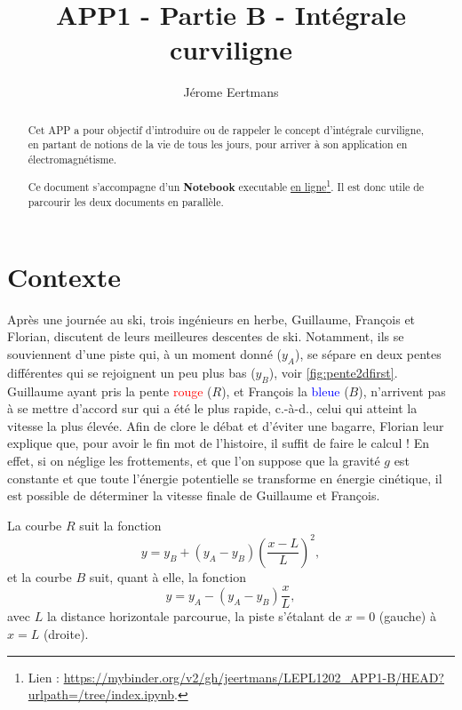 \documentclass{cup-pan}
\author{Jérome Eertmans}
\title{APP1 - Partie B - Intégrale curviligne}
\date{}
\begin{document}
\maketitle

\begin{abstract}

Cet APP a pour objectif d'introduire ou de rappeler le concept d'intégrale curviligne, en partant de notions de la vie de tous les jours, pour arriver à son application en électromagnétisme.

Ce document s'accompagne d'un \textbf{Notebook} executable \href{https://mybinder.org/v2/gh/jeertmans/LEPL1202_APP1-B/HEAD?urlpath=/tree/index.ipynb}{en ligne}\footnote{Lien : \url{https://mybinder.org/v2/gh/jeertmans/LEPL1202_APP1-B/HEAD?urlpath=/tree/index.ipynb}.}. Il est donc utile de parcourir les deux documents en parallèle.


\end{abstract}

\section{Contexte}

Après une journée au ski, trois ingénieurs en herbe, Guillaume, François et Florian, discutent de leurs meilleures descentes de ski. Notamment, ils se souviennent d'une piste qui, à un moment donné ($y_A$), se sépare en deux pentes différentes qui se rejoignent un peu plus bas ($y_B$), voir \autoref{fig:pente2dfirst}. Guillaume ayant pris la pente \textcolor{red}{rouge} ($R$), et François la \textcolor{blue}{bleue} ($B$), n'arrivent pas à se mettre d'accord sur qui a été le plus rapide, c.-à-d., celui qui atteint la vitesse la plus élevée. Afin de clore le débat et d'éviter une bagarre, Florian leur explique que, pour avoir le fin mot de l'histoire, il suffit de faire le calcul ! En effet, si on néglige les frottements, et que l'on suppose que la gravité $g$ est constante et que toute l'énergie potentielle se transforme en énergie cinétique, il est possible de déterminer la vitesse finale de Guillaume et François.

La courbe $R$ suit la fonction
\begin{equation}
    y = y_B + (y_A - y_B)\left(\frac{x-L}{L}\right)^2,
\end{equation}
et la courbe $B$ suit, quant à elle, la fonction
\begin{equation}
    y = y_A - (y_A - y_B)\frac{x}{L},
\end{equation}
avec $L$ la distance horizontale parcourue, la piste s'étalant de $x=0$ (gauche) à $x=L$ (droite).
\end{document}
